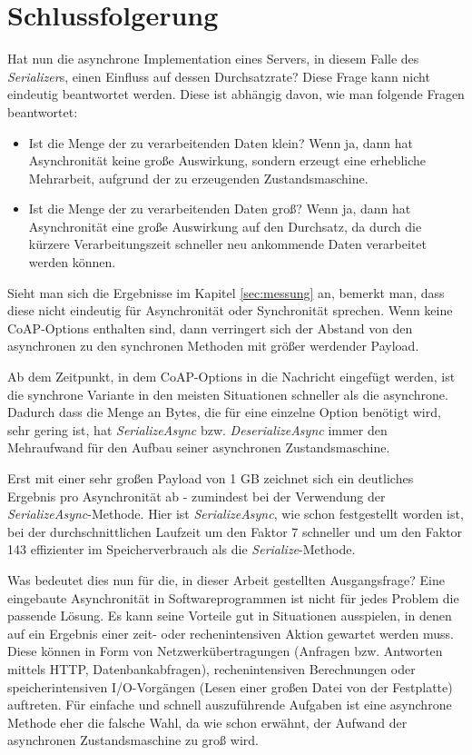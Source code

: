 \section{Schlussfolgerung}
\label{sec:schlussfolgerung}

Hat nun die asynchrone Implementation eines Servers, in diesem Falle des \textit{Serializer}s, einen Einfluss auf dessen Durchsatzrate? Diese Frage kann nicht eindeutig beantwortet werden. Diese ist abhängig davon, wie man folgende Fragen beantwortet:
\begin{itemize}
    \item Ist die Menge der zu verarbeitenden Daten klein? Wenn ja, dann hat Asynchronität keine große Auswirkung, sondern erzeugt eine erhebliche Mehrarbeit, aufgrund der zu erzeugenden Zustandsmaschine.
    \item Ist die Menge der zu verarbeitenden Daten groß? Wenn ja, dann hat Asynchronität eine große Auswirkung auf den Durchsatz, da durch die kürzere Verarbeitungszeit schneller neu ankommende Daten verarbeitet werden können.
\end{itemize}

Sieht man sich die Ergebnisse im Kapitel \ref{sec:messung} an, bemerkt man, dass diese nicht eindeutig für Asynchronität oder Synchronität sprechen. Wenn keine CoAP-Options enthalten sind, dann verringert sich der Abstand von den asynchronen zu den synchronen Methoden mit größer werdender Payload.

Ab dem Zeitpunkt, in dem CoAP-Options in die Nachricht eingefügt werden, ist die synchrone Variante in den meisten Situationen schneller als die asynchrone. Dadurch dass die Menge an Bytes, die für eine einzelne Option benötigt wird, sehr gering ist, hat \textit{SerializeAsync} bzw. \textit{DeserializeAsync} immer den Mehraufwand für den Aufbau seiner asynchronen Zustandsmaschine.

Erst mit einer sehr großen Payload von 1 GB zeichnet sich ein deutliches Ergebnis pro Asynchronität ab - zumindest bei der Verwendung der \textit{SerializeAsync}-Methode. Hier ist \textit{SerializeAsync}, wie schon festgestellt worden ist, bei der durchschnittlichen Laufzeit um den Faktor 7 schneller und um den Faktor 143 effizienter im Speicherverbrauch als die \textit{Serialize}-Methode. 

Was bedeutet dies nun für die, in dieser Arbeit gestellten Ausgangsfrage? Eine eingebaute Asynchronität in Softwareprogrammen ist nicht für jedes Problem die passende Lösung. Es kann seine Vorteile gut in Situationen ausspielen, in denen auf ein Ergebnis einer zeit- oder rechenintensiven Aktion gewartet werden muss. Diese können in Form von Netzwerkübertragungen (Anfragen bzw. Antworten mittels HTTP, Datenbankabfragen), rechenintensiven Berechnungen oder speicherintensiven I/O-Vorgängen (Lesen einer großen Datei von der Festplatte) auftreten. Für einfache und schnell auszuführende Aufgaben ist eine asynchrone Methode eher die falsche Wahl, da wie schon erwähnt, der Aufwand der asynchronen Zustandsmaschine zu groß wird.

